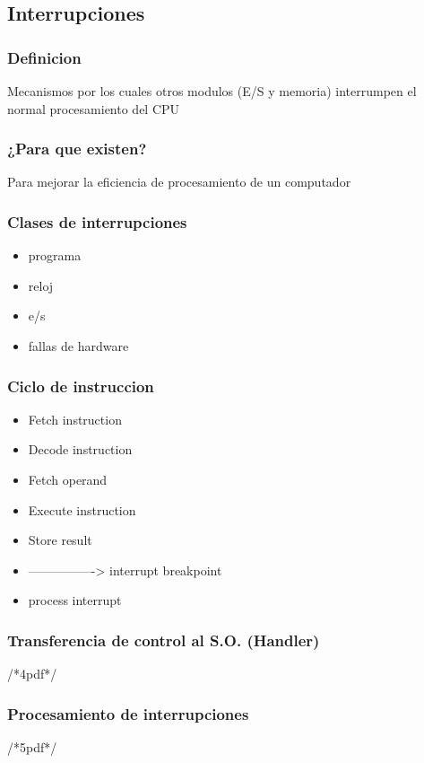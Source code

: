 
\subsection{Interrupciones}
\subsubsection{Definicion}
Mecanismos por los cuales otros modulos (E/S y memoria) interrumpen el normal procesamiento del CPU
\subsubsection{¿Para que existen?}
Para mejorar la eficiencia de procesamiento de un computador
\subsubsection{Clases de interrupciones}
\begin{itemize}
	\item programa
	\item  reloj
	\item e/s
	\item fallas de hardware
\end{itemize}

\subsubsection{Ciclo de instruccion}
\begin{itemize}
	\item Fetch instruction
	\item  Decode instruction
	\item Fetch operand
	\item Execute instruction
	\item Store result
	\item ----------------> interrupt breakpoint
	\item process interrupt
\end{itemize}

\subsubsection{Transferencia de control al S.O. (Handler)}
/*4pdf*/
	
\subsubsection{Procesamiento de interrupciones }
/*5pdf*/

